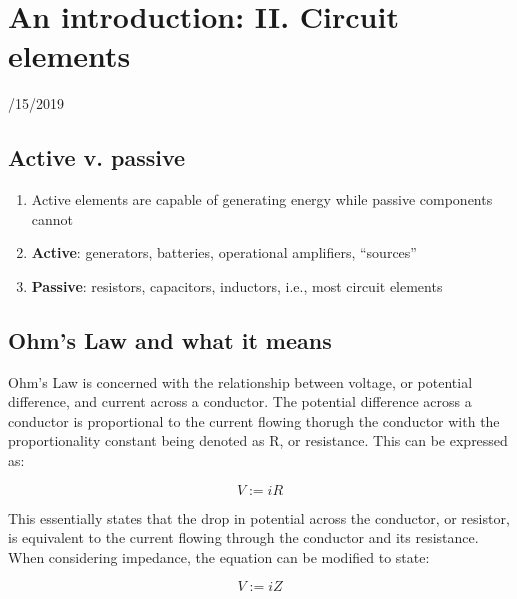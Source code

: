 \documentclass[11pt]{book}
\begin{document}
\chapter{An introduction: II. Circuit elements}
/15/2019
\section{Active v. passive}
\begin{enumerate}
	\item Active elements are capable of generating energy while passive components cannot
	\item \textbf{Active}: generators, batteries, operational amplifiers, ``sources''
	\item \textbf{Passive}: resistors, capacitors, inductors, i.e., most circuit elements
\end{enumerate}

\section{Ohm's Law and what it means}

Ohm's Law is concerned with the relationship between voltage, or potential difference, and current across a conductor.  The potential difference across a conductor is proportional to the current flowing thorugh the conductor with the proportionality constant being denoted as R, or resistance.  This can be expressed as:

	\begin{equation}
	\label{V=iR}
		V := iR
	\end{equation}
	
This essentially states that the drop in potential across the conductor, or resistor, is equivalent to the current flowing through the conductor and its resistance.  When considering impedance, the equation can be modified to state:

	\begin{equation}
	\label{V=iZ}
		V := iZ
	\end{equation}
\end{document}
